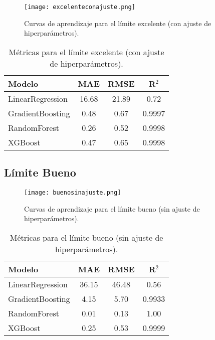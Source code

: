 \documentclass[12pt,a4paper]{article}
\begin{document}
\begin{itemize}
\begin{figure}[H]
    \centering
    \texttt{[image: excelenteconajuste.png]}
    \caption{Curvas de aprendizaje para el límite excelente (con ajuste de hiperparámetros).}
\end{figure}
\begin{table}[H]
\centering
\begin{tabular}{lccc}
\toprule
\textbf{Modelo} & \textbf{MAE} & \textbf{RMSE} & \textbf{R$^2$} \\
\midrule
LinearRegression & 16.68 & 21.89 & 0.72 \\
GradientBoosting & 0.48 & 0.67 & 0.9997 \\
RandomForest & 0.26 & 0.52 & 0.9998 \\
XGBoost & 0.47 & 0.65 & 0.9998 \\
\bottomrule
\end{tabular}
\caption{Métricas para el límite excelente (con ajuste de hiperparámetros).}
\end{table}

\subsection*{Límite Bueno}
\begin{figure}[H]
    \centering
    \texttt{[image: buenosinajuste.png]}
    \caption{Curvas de aprendizaje para el límite bueno (sin ajuste de hiperparámetros).}
\end{figure}
\begin{table}[H]
\centering
\begin{tabular}{lccc}
\toprule
\textbf{Modelo} & \textbf{MAE} & \textbf{RMSE} & \textbf{R$^2$} \\
\midrule
LinearRegression & 36.15 & 46.48 & 0.56 \\
GradientBoosting & 4.15 & 5.70 & 0.9933 \\
RandomForest & 0.01 & 0.13 & 1.00 \\
XGBoost & 0.25 & 0.53 & 0.9999 \\
\bottomrule
\end{tabular}
\caption{Métricas para el límite bueno (sin ajuste de hiperparámetros).}
\end{table}


\end{itemize}
\end{document}
